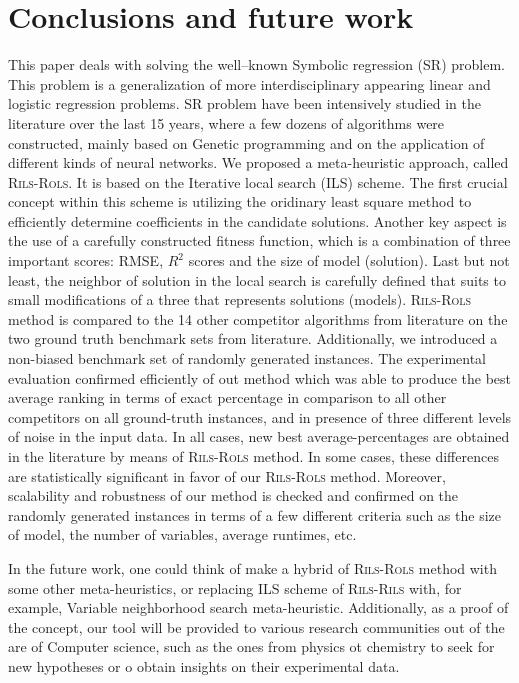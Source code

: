 \documentclass[a4paper,12pt]{elsarticle}
\begin{document}
\section{Conclusions and future work}\label{sec:conclusions}
  This paper deals with solving the well--known Symbolic regression (SR)  problem. This problem is a generalization of more interdisciplinary appearing  linear and logistic regression problems. SR problem have been intensively studied in the literature over the last 15 years, where a few dozens of algorithms were constructed, mainly based on Genetic programming and on the application of different kinds of neural networks. We proposed a meta-heuristic approach, called \textsc{Rils}-\textsc{Rols}. It is based on the Iterative local search (ILS) scheme. The first crucial concept within this scheme is utilizing the oridinary least square method to efficiently determine coefficients in the candidate solutions. Another key aspect is the use of a carefully constructed fitness function, which is a combination of three important scores: RMSE, $R^2$  scores and the size of model (solution).  Last but not least, the neighbor of solution in the local search is carefully defined that suits to small modifications of a three that represents solutions (models). \textsc{Rils-Rols} method is compared to the 14 other competitor algorithms from literature on the two ground truth benchmark sets from literature. Additionally, we introduced a non-biased benchmark set of randomly generated instances.  The experimental evaluation confirmed efficiently of out method which was able to produce the best average ranking in terms of exact percentage in comparison to all other competitors on all ground-truth instances, and in presence of three different levels of noise in the input data. In all cases, new best average-percentages are obtained in the literature by means of \textsc{Rils-Rols} method. In some cases, these differences are statistically significant in favor of our \textsc{Rils-Rols} method. Moreover, scalability and robustness of our method is  checked and confirmed on the randomly generated instances in terms of a few different criteria such as the size of model, the number of variables, average runtimes, etc.  
  
  In the future work, one could think of  make a hybrid of \textsc{Rils-Rols} method with some other meta-heuristics, or replacing ILS scheme of \textsc{Rils-Rils} with, for example, Variable neighborhood search meta-heuristic. Additionally, as a proof of the concept, our tool will be provided to various research communities out of the are of Computer science, such as the ones from physics ot chemistry to seek for new hypotheses or o obtain insights on their experimental data.  
  
\end{document}
